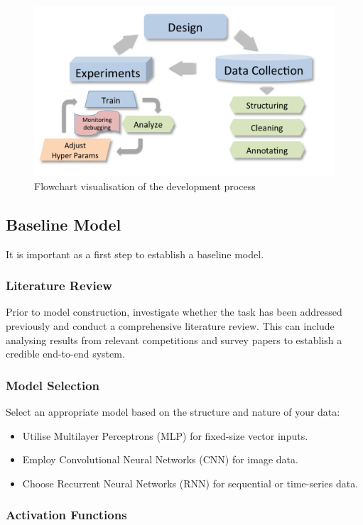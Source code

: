 \begin{figure}[H]
    \centering
    \includegraphics[width=0.75\linewidth]{img/desProcess.png}
    \caption{Flowchart visualisation of the development process}
\end{figure}
\subsection{Baseline Model}
It is important as a first step to establish a baseline model.

\subsubsection*{Literature Review}

 Prior to model construction, investigate whether the task has been addressed previously and conduct a comprehensive literature review. This can include analysing results from relevant competitions and survey papers to establish a credible end-to-end system.

\subsubsection*{Model Selection}

 Select an appropriate model based on the structure and nature of your data:
    \begin{itemize}
        \item Utilise Multilayer Perceptrons (MLP) for fixed-size vector inputs.
        \item Employ Convolutional Neural Networks (CNN) for image data.
        \item Choose Recurrent Neural Networks (RNN) for sequential or time-series data.
    \end{itemize}


\subsubsection*{Activation Functions}

